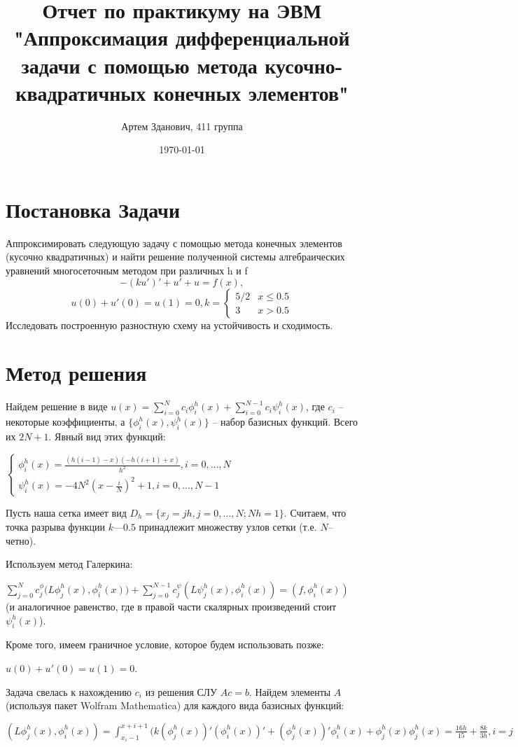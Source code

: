 \documentclass[12pt]{article}
\title{Отчет по практикуму на ЭВМ "Аппроксимация дифференциальной задачи с
помощью метода кусочно-квадратичных конечных элементов"
}
\author{Артем Зданович, 411 группа}
\date{\today}
\begin{document}
\maketitle

\section{Постановка  Задачи}
Аппроксимировать следующую задачу с помощью метода конечных элементов (кусочно квадратичных) и найти решение полученной системы алгебраических уравнений многосеточным
методом при различных h и f
$$-(ku')'+u'+u=f(x),$$ $$u(0)+u'(0)=u(1)=0, k=
\begin{cases}
5/2 & x \leq{0.5} \\
3 & x >0.5
\end{cases} $$
Исследовать построенную разностную схему на устойчивость и сходимость.
\section{Метод решения}
Найдем решение в виде $u(x)=\sum_{i=0}^{N}{c_i\phi_i^h(x)}+\sum_{i=0}^{N-1}{c_i\psi_i^h(x)}$, где $c_i$ -- некоторые коэффициенты, а $\{\phi_i^h(x),\psi_i^h(x)\}$ -- набор базисных функций. Всего их $2N+1$. Явный вид этих функций:

$\begin{cases}\phi_i^h(x)=\frac{(h(i-1)-x)(-h(i+1)+x)}{h^2},i=0,\dots,N \\ \psi_i^h(x)=-4N^2(x-\frac{i}{N})^2+1,i=0,\dots,N-1
\end{cases}$

Пусть наша сетка имеет вид $D_h=
\{x_j=jh,j=0,
\dots,N;Nh=1\}$. Считаем, что точка разрыва функции $k$---$0.5$ принадлежит множеству узлов сетки (т.е. $N$--четно).

Используем метод Галеркина:

$\sum_{j=0}^{N}{c_j^{\phi}(L\phi_j^h(x),\phi_i^h(x)})+\sum_{j=0}^{N-1}{c_j^{\psi}(L\psi_j^h(x),\phi_i^h(x))}=(f,\phi_i^h(x))$ (и аналогичное равенство, где в правой части скалярных произведений стоит $\psi_i^h(x)$).

Кроме того, имеем граничное условие, которое будем использовать позже:

$u(0)+u'(0)=u(1)=0$.

Задача свелась к нахождению $c_i$ из решения СЛУ $Ac=b$. Найдем элементы $A$ (используя пакет Wolfram Mathematica) для каждого вида базисных функций:

$(L\phi_j^h(x),\phi_i^h(x))=\int_{x_i-1}^{x+i+1}(k(\phi_j^h(x))'(\phi_i^h(x))'+(\phi_j^h(x))'\phi_i^h(x)+\phi_j^h(x)\phi_j^h(x)=\frac{16h}{15}+\frac{8k}{3h},i=j$
\end{document}
